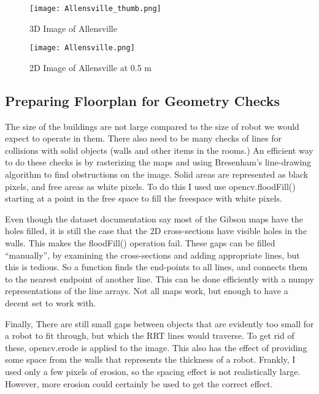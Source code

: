 \documentclass[10pt,twocolumn,letterpaper]{article}
\begin{document}
\begin{centering}
\begin{figure}[ht]
\caption{3D Image of Allensville}
\centering
\texttt{[image: Allensville\_thumb.png]}
\label{fig:Allensville_3D}
\end{figure}
\begin{figure}[ht]
\caption{2D Image of Allensville at 0.5 m}
\centering
\texttt{[image: Allensville.png]}
\label{fig:Allensville_2D}
\end{figure}
\end{centering}

\subsection{Preparing Floorplan for Geometry Checks}

The size of the buildings are not large compared to the size of robot
we would expect to operate in them. There also need to be many checks
of lines for collisions with solid objects (walls and other items in
the rooms.) An efficient way to do these checks is by rasterizing the
maps and using Bresenham's line-drawing algorithm to find obstructions
on the image. Solid areas are represented as black pixels, and free
areas as white pixels. To do this I used use opencv.floodFill()
starting at a point in the free space to fill the freespace with white
pixels.

Even though the dataset documentation say most of the Gibson maps have
the holes filled, it is still the case that the 2D cross-sections have
visible holes in the walls. This makes the floodFill() operation
fail. These gaps can be filled ``manually'', by examining the
cross-sections and adding appropriate lines, but this is tedious. So a
function finds the end-points to all lines, and connects them to the
nearest endpoint of another line. This can be done efficiently with a
numpy representations of the line arrays. Not all maps work, but
enough to have a decent set to work with.

Finally, There are still small gaps between objects that are evidently
too small for a robot to fit through, but which the RRT lines would
traverse. To get rid of these, opencv.erode is applied to the
image. This also has the effect of providing some space from the walls
that represents the thickness of a robot. Frankly, I used only a few
pixels of erosion, so the spacing effect is not realistically
large. However, more erosion could certainly be used to get the
correct effect.
\end{document}
